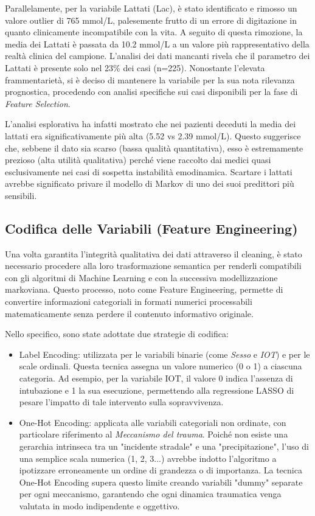 \documentclass[11pt, oneside, noexaminfo]{sapthesis}   	%
\begin{document}
Parallelamente, per la variabile Lattati (Lac), è stato identificato e rimosso un valore outlier di 765 mmol/L, palesemente frutto di un errore di digitazione in quanto clinicamente incompatibile con la vita. A seguito di questa rimozione, la media dei Lattati è passata da 10.2 mmol/L a un valore più rappresentativo della realtà clinica del campione. L'analisi dei dati mancanti rivela che il parametro dei Lattati è presente solo nel 23\% dei casi (n=225). Nonostante l'elevata frammentarietà, si è deciso di mantenere la variabile per la sua nota rilevanza prognostica, procedendo con analisi specifiche sui casi disponibili per la fase di \textit{Feature Selection}.

L'analisi esplorativa ha infatti mostrato che nei pazienti deceduti la media dei lattati era significativamente più alta (5.52 vs 2.39 mmol/L). Questo suggerisce che, sebbene il dato sia scarso (bassa qualità quantitativa), esso è estremamente prezioso (alta utilità qualitativa) perché viene raccolto dai medici quasi esclusivamente nei casi di sospetta instabilità emodinamica. Scartare i lattati avrebbe significato privare il modello di Markov di uno dei suoi predittori più sensibili.


\subsection{Codifica delle Variabili (Feature Engineering)}

Una volta garantita l'integrità qualitativa dei dati attraverso il cleaning, è stato necessario procedere alla loro trasformazione semantica per renderli compatibili con gli algoritmi di Machine Learning e con la successiva modellizzazione markoviana. Questo processo, noto come Feature Engineering, permette di convertire informazioni categoriali in formati numerici processabili matematicamente senza perdere il contenuto informativo originale.

Nello specifico, sono state adottate due strategie di codifica:
\begin{itemize}
\item Label Encoding: utilizzata per le variabili binarie (come \textit{Sesso} e \textit{IOT}) e per le scale ordinali. Questa tecnica assegna un valore numerico (0 o 1) a ciascuna categoria. Ad esempio, per la variabile IOT, il valore 0 indica l'assenza di intubazione e 1 la sua esecuzione, permettendo alla regressione LASSO di pesare l'impatto di tale intervento sulla sopravvivenza.

\item One-Hot Encoding: applicata alle variabili categoriali non ordinate, con particolare riferimento al \textit{Meccanismo del trauma}. Poiché non esiste una gerarchia intrinseca tra un "incidente stradale" e una "precipitazione", l'uso di una semplice scala numerica (1, 2, 3...) avrebbe indotto l'algoritmo a ipotizzare erroneamente un ordine di grandezza o di importanza. La tecnica One-Hot Encoding supera questo limite creando variabili "dummy" separate per ogni meccanismo, garantendo che ogni dinamica traumatica venga valutata in modo indipendente e oggettivo.
\end{itemize}
\end{document}
